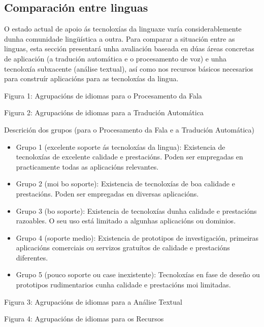 \begin{multicols}{2}
\subsection{Comparación entre linguas}
   O estado actual de apoio ás tecnoloxías da linguaxe varía considerablemente dunha comunidade lingüística a outra. Para comparar a situación entre as linguas, esta sección presentará unha avaliación baseada en dúas áreas concretas de aplicación (a tradución automática e o procesamento de voz) e unha tecnoloxía subxacente (análise textual), así como nos recursos básicos necesarios para construír aplicacións para as tecnoloxías da lingua.


Figura 1: Agrupacións de idiomas para o Procesamento da Fala

Figura 2: Agrupacións de idiomas para a Tradución Automática

Descrición dos grupos (para o Procesamento da Fala e a Tradución Automática)
	\begin{itemize}
	\item Grupo 1 (excelente soporte ás tecnoloxías da lingua): Existencia de tecnoloxías de excelente calidade e prestacións. Poden ser empregadas en practicamente todas as aplicacións relevantes.
	\item Grupo 2 (moi bo soporte): Existencia de tecnoloxías de boa calidade e prestacións. Poden ser empregadas en diversas aplicacións. 
	\item Grupo 3 (bo soporte): Existencia de tecnoloxías dunha calidade e prestacións razoables. O seu uso está limitado a algunhas aplicacións ou dominios.
	\item Grupo 4 (soporte medio): Existencia de prototipos de investigación, primeiras aplicacións comerciais ou servizos gratuítos de calidade e prestacións diferentes.
	\item Grupo 5 (pouco soporte ou case inexistente): Tecnoloxías en fase de deseño ou prototipos rudimentarios cunha calidade e prestacións moi limitadas.
	\end{itemize}

Figura 3: Agrupacións de idiomas para a Análise Textual

Figura 4: Agrupacións de idiomas para os Recursos


\end{multicols}
